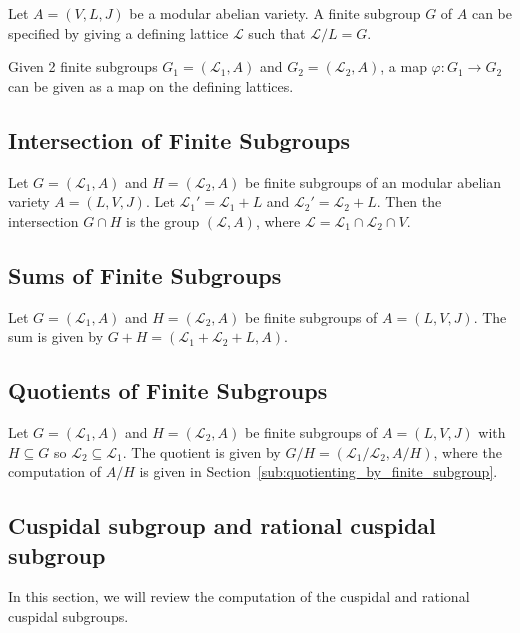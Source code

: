 Let $A=(V, L, J)$ be a modular abelian variety. A finite subgroup $G$ of $A$
can be specified by giving a defining lattice $\mathcal{L}$ such that
$\mathcal{L}/L = G$.

Given 2 finite subgroups $G_1=(\mathcal{L}_1, A)$ and $G_2=(\mathcal{L}_2, A)$,
a map $\varphi: G_1\to G_2$ can be given as a map on the defining lattices.

\subsection{Intersection of Finite Subgroups}
\label{sec:finitegroup_intersection}

Let $G=(\mathcal{L}_1, A)$ and $H=(\mathcal{L}_2, A)$ be finite subgroups of an
modular abelian variety $A=(L, V, J)$. Let $\mathcal{L}_1 ' = \mathcal{L}_1+L$
and $\mathcal{L}_2 ' = \mathcal{L}_2 + L$. Then the intersection $G\cap H$ is
the group $(\mathcal{L}, A)$, where $\mathcal{L}=\mathcal{L}_1\cap
\mathcal{L}_2 \cap V$.

\subsection{Sums of Finite Subgroups}

Let $G=(\mathcal{L}_1, A)$ and $H=(\mathcal{L}_2, A)$ be finite subgroups of
$A=(L, V, J)$. The sum is given by $G+H=(\mathcal{L}_1 + \mathcal{L}_2+L, A)$.

\subsection{Quotients of Finite Subgroups}

Let $G=(\mathcal{L}_1, A)$ and $H=(\mathcal{L}_2, A)$ be finite subgroups of
$A=(L, V, J)$ with $H\subseteq G$ so $\mathcal{L}_2\subseteq \mathcal{L}_1$.
The quotient is given by $G/H=(\mathcal{L}_1/\mathcal{L}_2, A/H)$, where the
computation of $A/H$ is given in
Section~\ref{sub:quotienting_by_finite_subgroup}.

\subsection{Cuspidal subgroup and rational cuspidal subgroup}%
\label{sub:cuspidal}

In this section, we will review the computation of the cuspidal and rational
cuspidal subgroups. 


